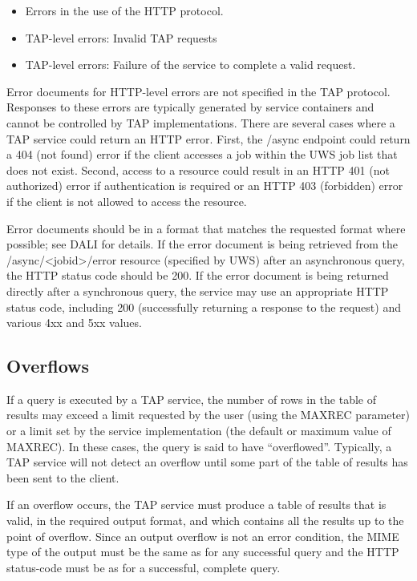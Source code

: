 \documentclass[11pt,letter]{ivoa}
\begin{document}
\begin{itemize}
\item Errors in the use of the HTTP protocol. 

\item TAP-level errors: Invalid TAP requests

\item TAP-level errors: Failure of the service to complete a valid request.
\end{itemize}

Error documents for HTTP-level errors are not specified in the TAP protocol. 
Responses to these errors are typically generated by service containers and 
cannot be controlled by TAP implementations. There are several cases where a 
TAP 
service could return an HTTP error. First, the /async endpoint could return a 
404 (not found) error if the client accesses a job within the UWS job list that 
does not exist. Second, access to a resource could result in an HTTP 401 (not 
authorized) error if authentication is required or an HTTP 403 (forbidden) 
error if the client is not allowed to access the resource.

Error documents should be in a format that matches the requested
format where possible; see DALI for details. 
If the error document is being retrieved 
from the /async/<jobid>/error resource (specified by UWS) after an asynchronous 
query, the HTTP status code should be 200. If the error document is being 
returned directly after a synchronous query, the service may use an appropriate 
HTTP status code, including 200 (successfully returning a response to the 
request) and various 4xx and 5xx values.

\subsection{Overflows}
\label{sec:query-overflow}

If a query is executed by a TAP service, the number of rows in the table of 
results may exceed a limit requested by the user (using the MAXREC parameter) 
or a limit set by the service implementation (the default or maximum value of 
MAXREC). In these cases, the query is said to have ``overflowed''. Typically, a 
TAP service will not detect an overflow until some part of the table of results 
has been sent to the client.

If an overflow occurs, the TAP service must produce a table of results that is 
valid, in the required output format, and which contains all the results up to 
the point of overflow. Since an output overflow is not an error condition, the 
MIME type of the output must be the same as for any successful query and the 
HTTP status-code must be as for a successful, complete query.
\end{document}
